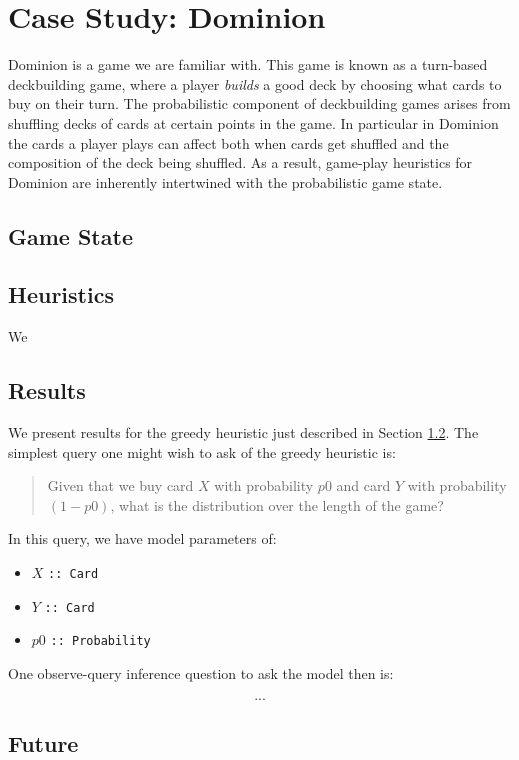 
\section{Case Study: Dominion} \label{sec:dom}

Dominion is a game we are familiar with. This game is known as a turn-based
deckbuilding game, where a player \emph{builds} a good deck by choosing what
cards to buy on their turn. The probabilistic component of deckbuilding games
arises from shuffling decks of cards at certain points in the game. In particular
in Dominion the cards a player plays can affect both when cards get shuffled
and the composition of the deck being shuffled. As a result, game-play heuristics
for Dominion are inherently intertwined with the probabilistic game state.

\subsection{Game State}

\subsection{Heuristics} \label{sec:dom:heuristics}
We

\subsection{Results}
We present results for the greedy heuristic just described in
Section \ref{sec:dom:heuristics}. The simplest query one might wish to ask of
the greedy heuristic is:

\begin{quote} \label{quote:dominion-query}
Given that we buy card $X$ with probability $p0$ and card $Y$ with
probability $(1 - p0)$, what is the distribution over the length of
the game?
\end{quote}

In this query, we have model parameters of:

\begin{itemize}
\item $X$  \texttt{:: Card}
\item $Y$  \texttt{:: Card}
\item $p0$ \texttt{:: Probability}
\end{itemize}

One observe-query inference question to ask the model then is:

\begin{equation} \label{eqn-inference-question}
...
\end{equation}

\subsection{Future}

